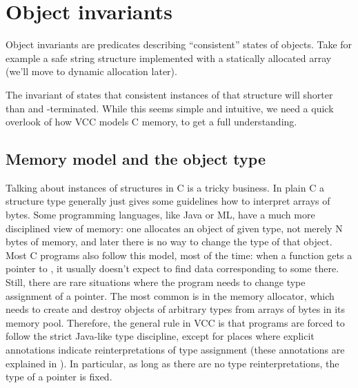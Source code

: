\section{Object invariants}

Object invariants are predicates describing ``consistent'' states of objects.
Take for example a safe string structure implemented with a
statically allocated array (we'll move to dynamic allocation later).


\noindent
The invariant of  states that consistent instances
of that structure will shorter than  and -terminated.
While this seems simple and intuitive, we need a quick overlook of how VCC
models C memory, to get a full understanding.

\subsection{Memory model and the object type}

Talking about instances of structures in C is a tricky business. 
In plain C a structure type generally just gives some guidelines how to interpret
arrays of bytes.
Some programming languages, like Java or ML, have a much more disciplined
view of memory:
one allocates an object of given type, not merely N bytes of memory,
and later there is no way to change the type of that object.
Most C programs also follow this model, most of the time:
when a function gets a pointer to , it usually doesn't
expect to find data corresponding to some  there.
Still, there are rare situations where the program needs to
change type assignment of a pointer.
The most common is in the memory allocator, which needs to create
and destroy objects of arbitrary types from arrays of bytes
in its memory pool.
Therefore, the general rule in VCC is that programs are forced to
follow the strict Java-like type discipline, except for places
where explicit annotations indicate reinterpretations of type assignment
(these annotations are explained in ).
In particular, as long as there are no type reinterpretations,
the type of a pointer is fixed.

